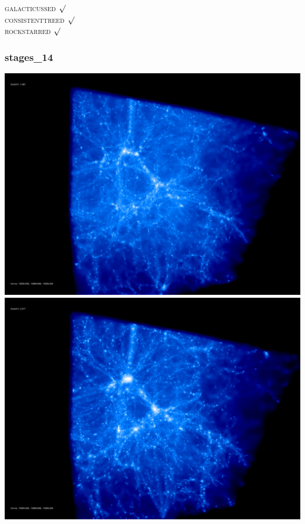 \textsc{galacticussed} $\surd$ \\
\textsc{consistenttreed} $\surd$ \\ 
\textsc{rockstarred} $\surd$
% 
%
%
%
%
%
%
%

\newpage
\subsubsection{stages\_14}

\includegraphics[scale=0.1]{r256/h100/stages_14/50.jpg} 
\includegraphics[scale=0.1]{r256/h100/stages_14/100.jpg}  \\

